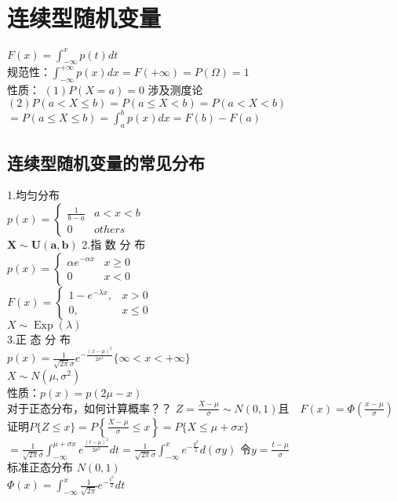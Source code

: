 \documentclass{report}
\begin{document}
\section{连续型随机变量 }
$F(x)=\int_{-\infty}^{x} p(t) d t$\\
规范性：$\int_{-\infty}^{+\infty} p(x) d x=F(+\infty)=P(\Omega)=1$\\
性质：
$(1)P(X=a)=0$ 涉及测度论\\
$(2)P(a<X \leq b)=P(a \leq X<b)=P(a<X<b)$\\
$=P(a \leq X \leq b)=\int_{a}^{b} p(x) d x=F(b)-F(a)$
\subsection{连续型随机变量的常见分布}
1.均匀分布\\
$p(x)=\left\{\begin{array}{ll}{\frac{1}{b-a}} & {a<x<b} \\ {0} & {others}\end{array}\right.$\\
$\boldsymbol{X} \sim \boldsymbol{U}(\boldsymbol{a}, \boldsymbol{b})$
2.指 数 分 布\\
$p(x)=\left\{\begin{array}{ll}{\alpha e^{-\alpha x}} & {x \geq 0} \\ {0} & {x<0}\end{array}\right.$\\
$F(x)=\left\{\begin{array}{cc}{1-e^{-\lambda x},} & {x>0} \\ {0,} & {x \leq 0}\end{array}\right.$\\
$X \sim \operatorname{Exp}(\lambda)$\\
3.正 态 分 布\\
$p(x)=\frac{1}{\sqrt{2 \pi} \sigma} e^{-\frac{(x-\mu)^{2}}{2 \sigma^{2}}}\lbrace \infty<x<+\infty \rbrace$ \\

$X \sim N\left(\mu, \sigma^{2}\right)$\\
性质：$p(x)=p(2 \mu-x)$\\
对于正态分布，如何计算概率？？
$Z=\frac{X-\mu}{\sigma} \sim N(0,1)且\quad F(x)=\Phi\left(\frac{x-\mu}{\sigma}\right)$\\
证明$P\{Z \leq x\}=P\left\{\frac{X-\mu}{\sigma} \leq x\right\}=P\{X \leq \mu+\sigma x\}$\\
$=\frac{1}{\sqrt{2 \pi} \sigma} \int_{-\infty}^{\mu+\sigma x} e^{\frac{(t-\mu)^{2}}{2 \sigma^{2}}} d t= \frac{1}{\sqrt{2 \pi} \sigma} \int_{-\infty}^{x} e^{-\frac{y^{2}}{2}} d(\sigma y)$ 令$y=\frac{t-\mu}{\sigma}$\\
标准正态分布 $N(0,1)$\\
$\Phi(x)=\int_{-\infty}^{x} \frac{1}{\sqrt{2 \pi}} e^{-\frac{t^{2}}{2}} d t$
\end{document}
